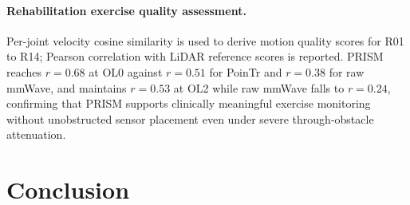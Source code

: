 \documentclass{article}
\begin{document}
\paragraph{Rehabilitation exercise quality assessment.}
Per-joint velocity cosine similarity is used to derive motion quality scores for R01
to R14; Pearson correlation with LiDAR reference scores is reported.
PRISM reaches $r\!=\!0.68$ at OL0 against $r\!=\!0.51$ for PoinTr and $r\!=\!0.38$
for raw mmWave, and maintains $r\!=\!0.53$ at OL2 while raw mmWave falls to
$r\!=\!0.24$, confirming that PRISM supports clinically meaningful exercise monitoring
without unobstructed sensor placement even under severe through-obstacle attenuation.

\begin{table}[t]
  \centering
  \caption{Downstream task performance on MIST (test subjects P07--P08).}
  \label{tab:downstream}
  \footnotesize
  \setlength{\tabcolsep}{4pt}
\end{table}

\section{Conclusion}
\label{sec:conclusion}
\end{document}

